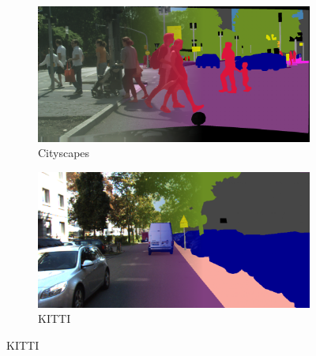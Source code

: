 \begin{figure}
\centering
  \begin{subfigure}[b]{0.49\columnwidth}
    \includegraphics[width=\columnwidth]{img/2-related-work/cityscapes_semantic_segmentation_overlay.png}
    \caption{Cityscapes \cite{Cityscapes}}
    \label{fig:example-city}
  \end{subfigure}
  \begin{subfigure}[b]{0.49\columnwidth}
    \includegraphics[width=\columnwidth]{img/2-related-work/kitti_semantic_segmentation_overlay.png}
    \caption{KITTI \cite{kitty}}
    \label{fig:example-kitti}
  \end{subfigure}


\end{figure}
